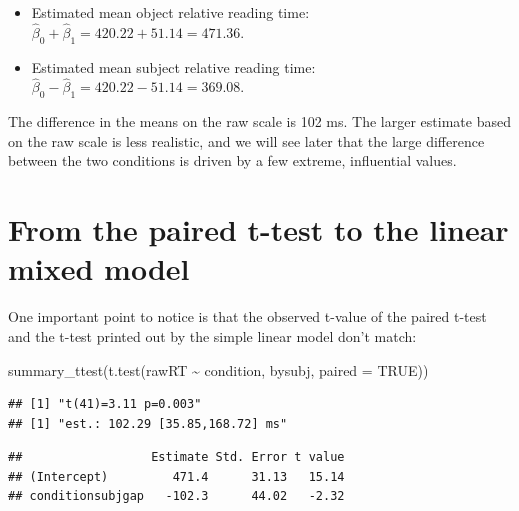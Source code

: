 \documentclass[
  12pt,
]{krantz}
\newenvironment{Shaded}{\begin{snugshade}}{\end{snugshade}}
\newcommand{\AttributeTok}[1]{\textcolor[rgb]{0.77,0.63,0.00}{#1}}
\newcommand{\ConstantTok}[1]{\textcolor[rgb]{0.00,0.00,0.00}{#1}}
\newcommand{\DecValTok}[1]{\textcolor[rgb]{0.00,0.00,0.81}{#1}}
\newcommand{\FunctionTok}[1]{\textcolor[rgb]{0.00,0.00,0.00}{#1}}
\newcommand{\NormalTok}[1]{#1}
\newcommand{\SpecialCharTok}[1]{\textcolor[rgb]{0.00,0.00,0.00}{#1}}
\providecommand{\tightlist}{%
  \setlength{\itemsep}{0pt}\setlength{\parskip}{0pt}}
\theoremstyle{definition}
\theoremstyle{definition}
\theoremstyle{definition}
\theoremstyle{definition}
\theoremstyle{remark}
\begin{document}
\begin{itemize}
\tightlist
\item
  Estimated mean object relative reading time: \(\hat\beta_0+\hat\beta_1=420.22+51.14=471.36\).
\item
  Estimated mean subject relative reading time: \(\hat\beta_0-\hat\beta_1=420.22-51.14=369.08\).
\end{itemize}

The difference in the means on the raw scale is 102 ms.
The larger estimate based on the raw scale is less realistic, and we will see later that the large difference between the two conditions is driven by a few extreme, influential values.

\hypertarget{from-the-paired-t-test-to-the-linear-mixed-model}{%
\section{From the paired t-test to the linear mixed model}\label{from-the-paired-t-test-to-the-linear-mixed-model}}

One important point to notice is that the observed t-value of the paired t-test and the t-test printed out by the simple linear model don't match:

\begin{Shaded}
\begin{Highlighting}[]
\FunctionTok{summary\_ttest}\NormalTok{(}\FunctionTok{t.test}\NormalTok{(rawRT }\SpecialCharTok{\textasciitilde{}}\NormalTok{ condition, bysubj, }
                     \AttributeTok{paired =} \ConstantTok{TRUE}\NormalTok{))}
\end{Highlighting}
\end{Shaded}

\begin{verbatim}
## [1] "t(41)=3.11 p=0.003"
## [1] "est.: 102.29 [35.85,168.72] ms"
\end{verbatim}

\begin{Shaded}
\end{Shaded}

\begin{verbatim}
##                  Estimate Std. Error t value
## (Intercept)         471.4      31.13   15.14
## conditionsubjgap   -102.3      44.02   -2.32
\end{verbatim}
\end{document}
